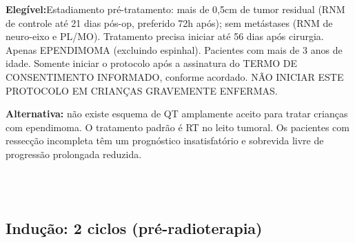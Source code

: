 \documentclass[11pt,a4paper,oldfontcommands]{memoir}
\begin{document}
\textbf{Elegível:}Estadiamento pré-tratamento: mais de 0,5cm de tumor residual (RNM de controle até 21 dias pós-op, preferido 72h após); sem metástases (RNM de neuro-eixo e PL/MO). Tratamento precisa iniciar até 56 dias após cirurgia. Apenas EPENDIMOMA (excluindo espinhal). Pacientes com mais de 3 anos de idade. Somente iniciar o protocolo após a assinatura do TERMO DE CONSENTIMENTO INFORMADO, conforme acordado. NÃO INICIAR ESTE PROTOCOLO EM CRIANÇAS GRAVEMENTE ENFERMAS.

\textbf{Alternativa:} não existe esquema de QT amplamente aceito para tratar crianças com ependimoma. O tratamento padrão é RT no leito tumoral. Os pacientes com ressecção incompleta têm um prognóstico insatisfatório e sobrevida livre de progressão prolongada reduzida.

\hfill \\

\hfill  {}\\

\subsection{Indução: 2 ciclos (pré-radioterapia)}
\renewcommand{\arraystretch}{1.5}
\end{document}
